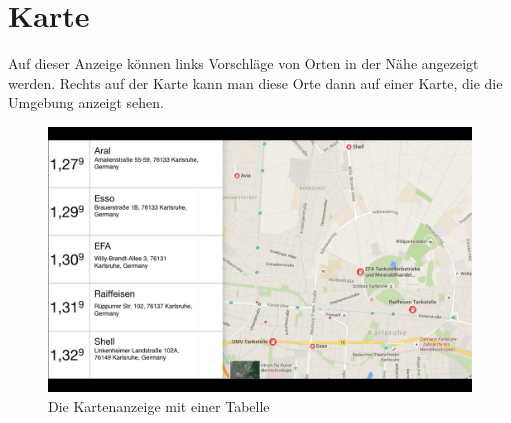 \documentclass[pflichtenheft.tex]{subfiles}
\begin{document}
\clearpage
\section{Karte}
\label{sec:Karte}

Auf dieser Anzeige können links Vorschläge von Orten in der Nähe angezeigt werden. Rechts auf der Karte kann man diese Orte dann auf einer Karte, die die Umgebung anzeigt sehen. 

\begin{figure}[h]
  	\begin{center}
 		\includegraphics[width=\textwidth]{Images/GUI-Map.png}
  		\caption{Die Kartenanzeige mit einer Tabelle}
  	\end{center}
\end{figure}
\end{document}
